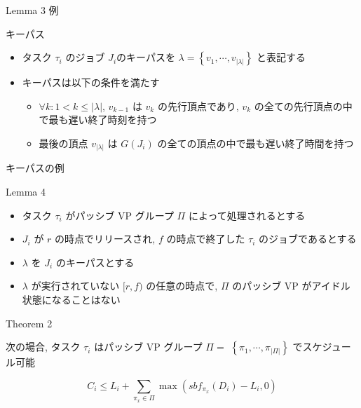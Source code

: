\begin{frame}{Lemma 3 例}
\end{frame}

\begin{frame}{キーパス}
    \begin{definition}[キーパス]
        \setlength{\linewidth}{0.98\columnwidth}
        \begin{itemize}
            \item タスク $\tau_{i}$ のジョブ $J_{i}$のキーパスを $\lambda=\left\{v_{1}, \cdots, v_{|\lambda|}\right\}$ と表記する
            \item キーパスは以下の条件を満たす
            \begin{itemize}
                \item $\forall k: 1<k \leq|\lambda|$, $v_{k-1}$ は $v_{k}$ の先行頂点であり, $v_{k}$ の全ての先行頂点の中で最も遅い終了時刻を持つ
                \item 最後の頂点 $v_{|\lambda|}$ は $G\left(J_{i}\right)$ の全ての頂点の中で最も遅い終了時間を持つ
            \end{itemize}
        \end{itemize}
    \end{definition}
\end{frame}

\begin{frame}{キーパスの例}
\end{frame}

\begin{frame}[label=lemma4]{Lemma 4}
    \begin{lemma}[]
        \begin{itemize}
            \item タスク $\tau_{i}$ がパッシブ VP グループ $\Pi$ によって処理されるとする
            \item $J_{i}$ が $r$ の時点でリリースされ, $f$ の時点で終了した $\tau_{i}$ のジョブであるとする
            \item $\lambda$ を $J_{i}$ のキーパスとする
            \item $\lambda$ が実行されていない $[r, f)$ の任意の時点で, $\Pi$ のパッシブ VP がアイドル状態になることはない
        \end{itemize}
    \end{lemma}
\end{frame}

\begin{frame}[label=theorem2]{Theorem 2}
    \begin{theorem}[]
        次の場合, タスク $\tau_{i}$ はパッシブ VP グループ $\Pi=$  $\left\{\pi_{1}, \cdots, \pi_{|\Pi|}\right\}$ でスケジュール可能

        \begin{equation*}
            C_{i} \leq L_{i}+\sum_{\pi_{x} \in \Pi} \max \left(s b f_{\pi_{x}}\left(D_{i}\right)-L_{i}, 0\right)
        \end{equation*}
    \end{theorem}
\end{frame}
